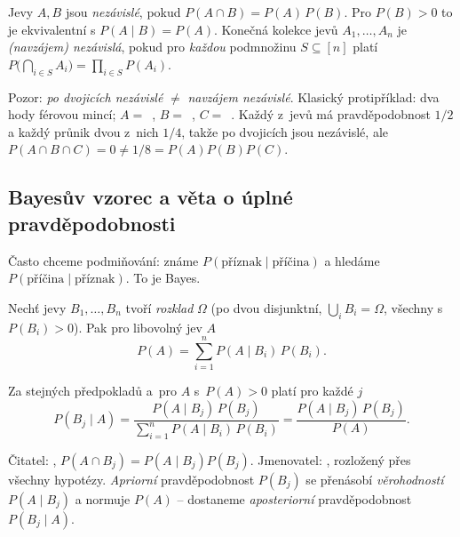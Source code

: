 \documentclass[11pt,a4paper]{article}
\begin{document}
\begin{definice}
Jevy $A,B$ jsou \emph{nezávislé}, pokud $P(A\cap B)=P(A)\,P(B)$. Pro $P(B)>0$ to je ekvivalentní s $P(A\mid B)=P(A)$. Konečná kolekce jevů $A_1,\dots,A_n$ je \emph{(navzájem) nezávislá}, pokud pro \emph{každou} podmnožinu $S\subseteq[n]$ platí $P\big(\bigcap_{i\in S} A_i\big)=\prod_{i\in S} P(A_i)$.
\end{definice}

\begin{intuice}
Pozor: \emph{po dvojicích nezávislé} $\ne$ \emph{navzájem nezávislé}. Klasický protipříklad: dva hody férovou mincí; $A=$~, $B=$~, $C=$~. Každý z~jevů má pravděpodobnost $1/2$ a každý průnik dvou z~nich $1/4$, takže po dvojicích jsou nezávislé, ale $P(A\cap B\cap C)=0\ne 1/8=P(A)P(B)P(C)$.
\end{intuice}

\subsection{Bayesův vzorec a věta o úplné pravděpodobnosti}

Často chceme  podmiňování: známe $P(\text{příznak}\mid \text{příčina})$ a hledáme $P(\text{příčina}\mid \text{příznak})$. To je Bayes.


\begin{veta}
Nechť jevy $B_1,\dots,B_n$ tvoří \emph{rozklad} $\Omega$ (po dvou disjunktní, $\bigcup_i B_i=\Omega$, všechny s~$P(B_i)>0$). Pak pro libovolný jev $A$
\[
P(A)=\sum_{i=1}^{n} P(A\mid B_i)\,P(B_i).
\]
\end{veta}

\begin{veta}
Za stejných předpokladů a~pro $A$ s~$P(A)>0$ platí pro každé $j$
\[
P(B_j\mid A)=\frac{P(A\mid B_j)\,P(B_j)}{\sum_{i=1}^{n} P(A\mid B_i)\,P(B_i)}=\frac{P(A\mid B_j)\,P(B_j)}{P(A)}.
\]
\end{veta}

\begin{intuice}
Čitatel: , $P(A\cap B_j)=P(A\mid B_j)P(B_j)$. Jmenovatel: , rozložený přes všechny hypotézy. \emph{Apriorní} pravděpodobnost $P(B_j)$ se přenásobí \emph{věrohodností} $P(A\mid B_j)$ a normuje $P(A)$ -- dostaneme \emph{aposteriorní} pravděpodobnost $P(B_j\mid A)$.
\end{intuice}
\end{document}
